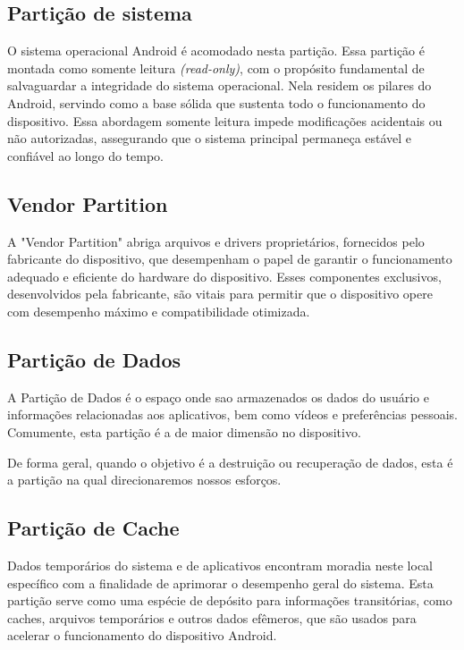\subsection{Partição de sistema}

O sistema operacional Android é acomodado nesta partição. Essa partição é montada como somente leitura \emph{(read-only)}, com o propósito fundamental de salvaguardar a integridade do sistema operacional. Nela residem os pilares do Android, servindo como a base sólida que sustenta todo o funcionamento do dispositivo. Essa abordagem somente leitura impede modificações acidentais ou não autorizadas, assegurando que o sistema principal permaneça estável e confiável ao longo do tempo.

\subsection{Vendor Partition}

A "Vendor Partition" abriga arquivos e drivers proprietários, fornecidos pelo fabricante do dispositivo, que desempenham o papel de garantir o funcionamento adequado e eficiente do hardware do dispositivo. Esses componentes exclusivos, desenvolvidos pela fabricante, são vitais para permitir que o dispositivo opere com desempenho máximo e compatibilidade otimizada.

\subsection{Partição de Dados}
\label{particao_de_dados}

A Partição de Dados é o espaço onde sao armazenados os dados do usuário e informações relacionadas aos aplicativos, bem como vídeos e preferências pessoais. Comumente, esta partição é a de maior dimensão no dispositivo.

De forma geral, quando o objetivo é a destruição ou recuperação de dados, esta é a partição na qual direcionaremos nossos esforços.

\subsection{Partição de Cache}

Dados temporários do sistema e de aplicativos encontram moradia neste local específico com a finalidade de aprimorar o desempenho geral do sistema. Esta partição serve como uma espécie de depósito para informações transitórias, como caches, arquivos temporários e outros dados efêmeros, que são usados para acelerar o funcionamento do dispositivo Android.

